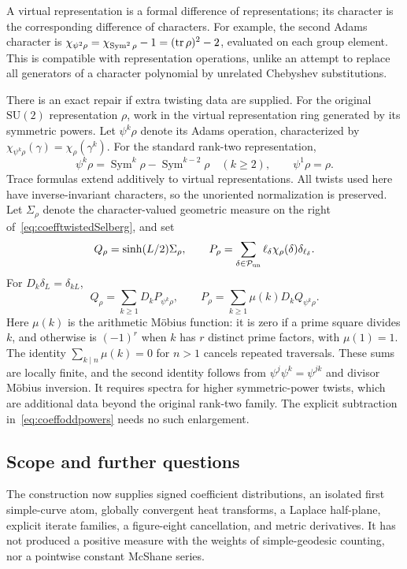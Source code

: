 A virtual representation is a formal difference of representations;
its character is the corresponding difference of characters.
For example, the second Adams character is
$\chi_{\psi^2\rho}=\chi_{\operatorname{Sym}^2\rho}-1
=(\operatorname{tr}\rho)^2-2$, evaluated on each group element.
This is compatible with representation operations, unlike an
attempt to replace all generators of a character polynomial by
unrelated Chebyshev substitutions.

There is an exact repair if extra twisting data are supplied.
For the original $\mathrm{SU}(2)$ representation $\rho$, work in
the virtual representation ring generated by its symmetric powers.
Let $\psi^k\rho$ denote its Adams operation, characterized by
$\chi_{\psi^k\rho}(\gamma)=\chi_\rho(\gamma^k)$. For the
standard rank-two representation,
\[
 \psi^k\rho=\operatorname{Sym}^k\rho-
             \operatorname{Sym}^{k-2}\rho\quad(k\geq2),
 \qquad \psi^1\rho=\rho.
\]
Trace formulas extend additively to virtual representations.
All twists used here have inverse-invariant characters, so the
unoriented normalization is preserved. Let $\Sigma_\rho$ denote the character-valued geometric measure
on the right of~\eqref{eq:coefftwistedSelberg}, and set
\[
 Q_\rho=\sinh(L/2)\Sigma_\rho,\qquad
 P_\rho=\sum_{\delta\in\mathcal P_{\rm un}}
         \ell_\delta\chi_\rho(\delta)\delta_{\ell_\delta}.
\]
For $D_k\delta_L=\delta_{kL}$,
\[
 Q_\rho=\sum_{k\geq1}D_kP_{\psi^k\rho},\qquad
 \boxed{P_\rho=\sum_{k\geq1}\mu(k)D_kQ_{\psi^k\rho}.}
\]
Here $\mu(k)$ is the arithmetic M\"obius function: it is zero
if a prime square divides $k$, and otherwise is $(-1)^r$ when
$k$ has $r$ distinct prime factors, with $\mu(1)=1$.
The identity $\sum_{k\mid n}\mu(k)=0$ for $n>1$ cancels
repeated traversals. These sums are locally finite, and the second identity follows from
$\psi^j\psi^k=\psi^{jk}$ and divisor M\"obius inversion. It requires
spectra for higher symmetric-power twists, which are additional
data beyond the original rank-two family. The explicit subtraction
in~\eqref{eq:coeffoddpowers} needs no such enlargement.

\subsection{Scope and further questions}

The construction now supplies signed coefficient distributions,
an isolated first simple-curve atom, globally convergent heat
transforms, a Laplace half-plane, explicit iterate families, a
figure-eight cancellation, and metric derivatives. It has not
produced a positive measure with the weights of simple-geodesic
counting, nor a pointwise constant McShane series.

